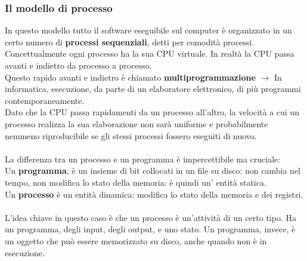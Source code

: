 \documentclass{article}
\begin{document}
\subsubsection{Il modello di processo}
In questo modello tutto il software eseguibile sul computer è organizzato in un certo numero di \textbf{processi sequenziali}, detti per comodità processi.
\\
Concettualmente ogni processo ha la sua CPU virtuale. In realtà la CPU passa avanti e indietro da processo a processo. \\
Questo rapido avanti e indietro è chiamato \textbf{multiprogrammazione} $\rightarrow$ In informatica, esecuzione, da parte di un elaboratore elettronico, di più programmi contemporaneamente.
\\Dato che la CPU passa rapidamenti da un processo all’altro, la velocità a cui un processo realizza la sua elaborazione non sarà uniforme e probabilmente nemmeno riproducibile se gli stessi processi fossero eseguiti di nuovo.
\\
\\
La differenza tra un processo e un programma è impercettibile ma cruciale: 
\\
Un \textbf{programma}, è un insieme di bit collocati in un file su disco: non cambia nel tempo, non modifica lo stato della memoria: è quindi un' entità statica. 
\\Un \textbf{processo} è un entità dinamica: modifica lo stato della memoria e dei registri.
\\
\\
L’idea chiave in questo caso è che un processo è un’attività di un certo tipo. Ha un programma, degli input, degli output, e uno stato. Un programma, invece, è un oggetto che può essere memorizzato su disco, anche quando non è in esecuzione. 
\end{document}
